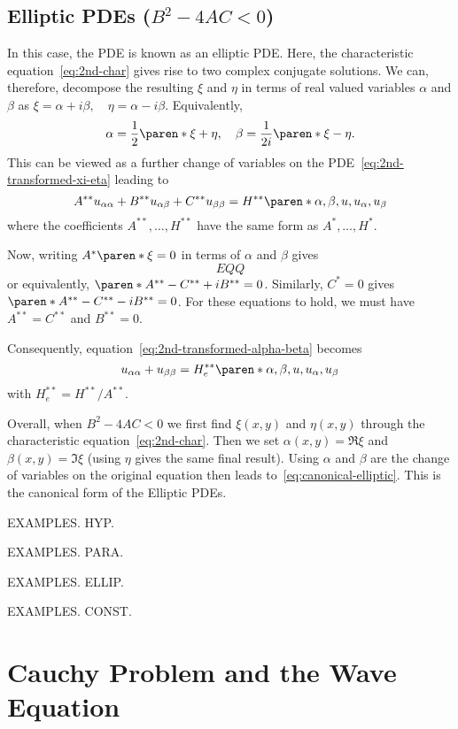 \documentclass[11pt]{penrose}
\begin{document}
\subsection{Elliptic PDEs \texorpdfstring{($B^2 - 4AC < 0$)}{B2 - 4AC < 0}}
In this case, the PDE is known as an elliptic PDE. Here, the characteristic equation~\eqref{eq:2nd-char} gives rise to two complex conjugate solutions. We can, therefore, decompose the resulting $\xi$ and $\eta$ in terms of real valued variables $\alpha$ and $\beta$ as $\xi = \alpha + i\beta, \quad \eta = \alpha - i \beta$. Equivalently,
\begin{equation}
    \alpha = \frac{1}{2} \paren*{\xi + \eta},
    \quad
    \beta = \frac{1}{2i} \paren*{\xi - \eta}.
\end{equation}
This can be viewed as a further change of variables on the PDE~\eqref{eq:2nd-transformed-xi-eta} leading to
\begin{equation}
    A^{**} u_{\alpha\alpha} + B^{**} u_{\alpha\beta} + C^{**} u_{\beta\beta} = H^{**}\paren*{\alpha, \beta, u, u_\alpha, u_\beta}
    \label{eq:2nd-transformed-alpha-beta}
\end{equation}
where the coefficients $A^{**}, \dots, H^{**}$ have the same form as $A^{*}, \dots, H^{*}$.

Now, writing $A^{*}\paren*{\xi} = 0$ in terms of $\alpha$ and $\beta$ gives
\begin{equation}
    EQQ
\end{equation}
or equivalently, $\paren*{A^{**} - C^{**}} + i B^{**} = 0$. Similarly, $C^{*} = 0$ gives $\paren*{A^{**} - C^{**}} - i B^{**} = 0$. For these equations to hold, we must have $A^{**} = C^{**}$ and $B^{**} = 0$.

Consequently, equation~\eqref{eq:2nd-transformed-alpha-beta} becomes
\begin{equation}
    u_{\alpha\alpha} + u_{\beta\beta} = H_{e}^{**} \paren*{\alpha, \beta, u, u_\alpha, u_\beta}
    \label{eq:canonical-elliptic}
\end{equation}
with $H_{e}^{**} = H^{**} / A^{**}$.

Overall, when $B^2 - 4AC < 0$ we first find $\xi(x,y)$ and $\eta(x,y)$ through the characteristic equation~\eqref{eq:2nd-char}. Then we set $\alpha(x,y) = \Re \xi$ and $\beta(x,y) = \Im \xi$ (using $\eta$ gives the same final result). Using $\alpha$ and $\beta$ are the change of variables on the original equation then leads to~\eqref{eq:canonical-elliptic}. This is the canonical form of the Elliptic PDEs.

\begin{negg}
    EXAMPLES. HYP.
\end{negg}

\begin{negg}
    EXAMPLES. PARA.
\end{negg}

\begin{negg}
    EXAMPLES. ELLIP.
\end{negg}

\begin{negg}
    EXAMPLES. CONST.
\end{negg}

\section{Cauchy Problem and the Wave Equation}
\end{document}
